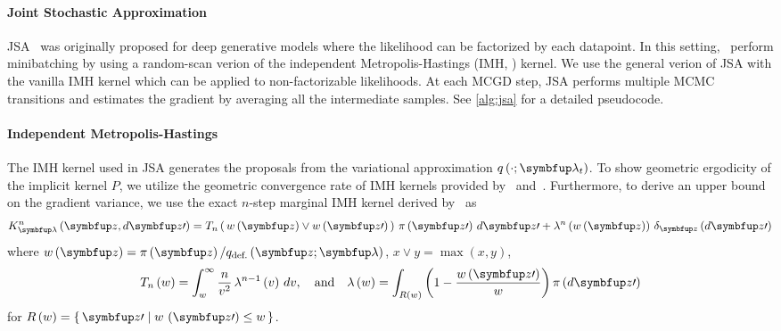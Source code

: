 \vspace{-0.1in}
\paragraph{Joint Stochastic Approximation}
JSA~\citep{pmlr-v124-ou20a} was originally proposed for deep generative models where the likelihood can be factorized by each datapoint.
In this setting,~\citeauthor{pmlr-v124-ou20a} perform minibatching by using a random-scan verion of the independent Metropolis-Hastings (IMH, \citealt{hastings_monte_1970,robert_monte_2004}) kernel.
We use the general verion of JSA with the vanilla IMH kernel which can be applied to non-factorizable likelihoods.
At each MCGD step, JSA performs multiple MCMC transitions and estimates the gradient by averaging all the intermediate samples.
See \cref{alg:jsa} for a detailed pseudocode.

\vspace{-0.1in}
\paragraph{Independent Metropolis-Hastings}
The IMH kernel used in JSA generates the proposals from the variational approximation \(q\left(\cdot; \vlambda_t\right)\).
To show geometric ergodicity of the implicit kernel \(P\), we utilize the geometric convergence rate of IMH kernels provided by~\citet[Theorem 2.1]{10.2307/2242610} and~\citet{wang_exact_2020}.
Furthermore, to derive an upper bound on the gradient variance, we use the exact \(n\)-step marginal IMH kernel derived by~\citet{Smith96exacttransition} as
{%
  \begin{align}
  K^n_{\vlambda}\left(\vz, d\vz\prime\right) 
  = T_n\left(\, w\left(\vz\right) \vee w\left(\vz\prime\right)\,\right) \, \pi\left(\vz\prime\right) \, d\vz\prime
  + \lambda^n\left(w\left(\vz\right)\right) \, \delta_{\vz}\left(d\vz\prime\right)
  \label{eq:imh_exact_kernel}
  \end{align}
}%
where {\(w\left(\vz\right) = \pi\left(\vz\right)/q_{\text{def.}}\left(\vz; \vlambda\right)\), \(x \vee y = \max\left(x, y\right)\)},
{\small
  \begin{align}
    T_n\left(w\right)      = \int_w^{\infty}
    \frac{n}{v^2}
    \, \lambda^{n-1}\left(v\right)\,dv,
    \quad\text{and}\quad
    \lambda\left(w\right) =
    \int_{R\left(w\right)}
    \left( 1 - \frac{w\left(\vz\prime\right)}{w}  \right)
    \pi\left(d\vz\prime\right)\label{eq:T_lambda}
  \end{align}
}
for {\(R\left(w\right) = \{\, \vz\prime \mid w\,\left(\vz\prime\right) \leq w \,\}\)}.
%


%

